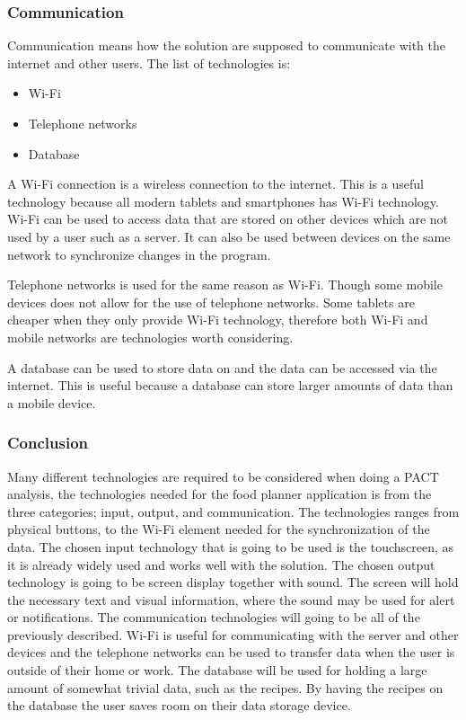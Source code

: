 \subsubsection{Communication}
Communication means how the solution are supposed to communicate with the internet and other users. The list of technologies is:

\begin{itemize}
	\item Wi-Fi
	\item Telephone networks
    \item Database
\end{itemize}

A Wi-Fi connection is a wireless connection to the internet.
This is a useful technology because all modern tablets and smartphones has Wi-Fi technology.
Wi-Fi can be used to access data that are stored on other devices which are not used by a user such as a server.
It can also be used between devices on the same network to synchronize changes in the program.    
%

Telephone networks is used for the same reason as Wi-Fi. Though some mobile devices does not allow for the use of telephone networks.
Some tablets are cheaper when they only provide Wi-Fi technology, therefore both Wi-Fi and mobile networks are technologies worth considering.

A database can be used to store data on and the data can be accessed via the internet.
This is useful because a database can store larger amounts of data than a mobile device.
 
\subsubsection{Conclusion}
Many different technologies are required to be considered when doing a PACT analysis, the technologies needed for the food planner application is from the three categories; input, output, and communication.
The technologies ranges from physical buttons, to the Wi-Fi element needed for the synchronization of the data. The chosen input technology that is going to be used is the touchscreen, as it is already widely used and works well with the solution. The chosen output technology is going to be screen display together with sound. The screen will hold the necessary text and visual information, where the sound may be used for alert or notifications. The communication technologies will going to be all of the previously described. Wi-Fi is useful for communicating with the server and other devices and the telephone networks can be used to transfer data when the user is outside of their home or work. The database will be used for holding a large amount of somewhat trivial data, such as the recipes. By having the recipes on the database the user saves room on their data storage device.